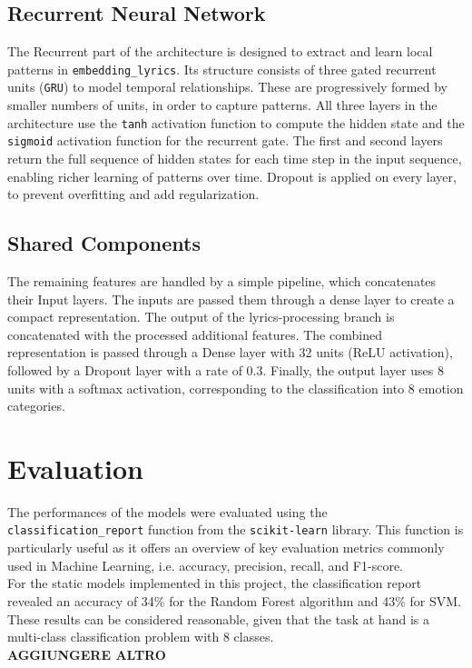 \subsection*{Recurrent Neural Network}
The Recurrent part of the architecture is designed to extract and learn
local patterns in \texttt{embedding\_lyrics}.
Its structure consists of three gated recurrent units (\texttt{GRU})
to model temporal relationships. These are progressively formed by smaller
numbers of units, in order to capture patterns. All three layers in the
architecture use the \texttt{tanh} activation function to compute the hidden state and
the \texttt{sigmoid} activation function for the recurrent gate.
The first and second layers return the full sequence of hidden states for each
time step in the input sequence, enabling richer learning of patterns over time.
Dropout is applied on every layer, to prevent overfitting and add regularization.


\subsection*{Shared Components}
The remaining features are handled by a simple pipeline, which concatenates
their Input layers.
The inputs are passed them through a dense layer to create a compact
representation.
The output of the lyrics-processing branch is concatenated with the processed
additional features.
The combined representation is passed through a Dense layer with 32 units
(ReLU activation), followed by a Dropout layer with a rate of 0.3.
Finally, the output layer uses 8 units with a softmax activation, corresponding
to the classification into 8 emotion categories.


\section*{Evaluation}
The performances of the models were evaluated using the \texttt{classification\_report} function from the \texttt{scikit-learn} library. 
This function is particularly useful as it offers an overview of key evaluation metrics commonly used in Machine Learning, i.e. accuracy, precision, recall, and F1-score.\\
For the static models implemented in this project, the classification report revealed an accuracy of 34\% for the Random Forest algorithm and 43\% for SVM. 
These results can be considered reasonable, given that the task at hand is a multi-class classification problem with 8 classes.\\

\textbf{AGGIUNGERE ALTRO}